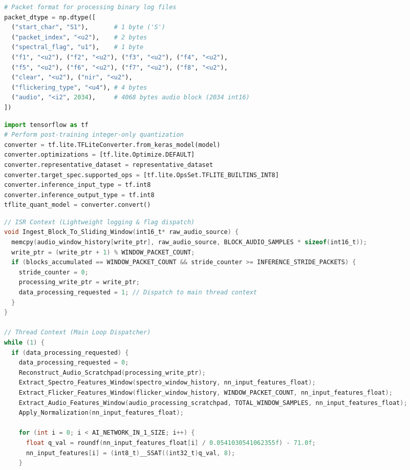 \documentclass[10pt]{article}
\begin{document}
\begin{multicols}{2}
\begin{lstlisting}[language=Python, caption=Python Script for VCP Memory Download]
# Packet format for processing binary log files
packet_dtype = np.dtype([
  ("start_char", "S1"),       # 1 byte ('S')
  ("packet_index", "<u2"),    # 2 bytes
  ("spectral_flag", "u1"),    # 1 byte
  ("f1", "<u2"), ("f2", "<u2"), ("f3", "<u2"), ("f4", "<u2"),
  ("f5", "<u2"), ("f6", "<u2"), ("f7", "<u2"), ("f8", "<u2"),
  ("clear", "<u2"), ("nir", "<u2"),
  ("flickering_type", "<u4"), # 4 bytes
  ("audio", "<i2", 2034),     # 4068 bytes audio block (2034 int16)
])
\end{lstlisting}

\begin{lstlisting}[language=Python, caption=TensorFlow Optimization and TFLite Export]
import tensorflow as tf
# Perform post-training integer-only quantization
converter = tf.lite.TFLiteConverter.from_keras_model(model)
converter.optimizations = [tf.lite.Optimize.DEFAULT]
converter.representative_dataset = representative_dataset
converter.target_spec.supported_ops = [tf.lite.OpsSet.TFLITE_BUILTINS_INT8]
converter.inference_input_type = tf.int8
converter.inference_output_type = tf.int8
tflite_quant_model = converter.convert()
\end{lstlisting}

\begin{lstlisting}[language=C, caption=On-Chip TinyML Inference Loop Execution]
// ISR Context (Lightweight logging & flag dispatch)
void Ingest_Block_To_Sliding_Window(int16_t* raw_audio_source) {
  memcpy(audio_window_history[write_ptr], raw_audio_source, BLOCK_AUDIO_SAMPLES * sizeof(int16_t));
  write_ptr = (write_ptr + 1) % WINDOW_PACKET_COUNT;
  if (blocks_accumulated == WINDOW_PACKET_COUNT && stride_counter >= INFERENCE_STRIDE_PACKETS) {
    stride_counter = 0;
    processing_write_ptr = write_ptr;
    data_processing_requested = 1; // Dispatch to main thread context
  }
}

// Thread Context (Main Loop Dispatcher)
while (1) {
  if (data_processing_requested) {
    data_processing_requested = 0;
    Reconstruct_Audio_Scratchpad(processing_write_ptr);
    Extract_Spectro_Features_Window(spectro_window_history, nn_input_features_float);
    Extract_Flicker_Features_Window(flicker_window_history, WINDOW_PACKET_COUNT, nn_input_features_float);
    Extract_Audio_Features_Window(audio_processing_scratchpad, TOTAL_WINDOW_SAMPLES, nn_input_features_float);
    Apply_Normalization(nn_input_features_float);
    
    for (int i = 0; i < AI_NETWORK_IN_1_SIZE; i++) {
      float q_val = roundf(nn_input_features_float[i] / 0.0541030541062355f) - 71.0f;
      nn_input_features[i] = (int8_t)__SSAT((int32_t)q_val, 8);
    }
    

\end{lstlisting}
\end{multicols}
\end{document}
